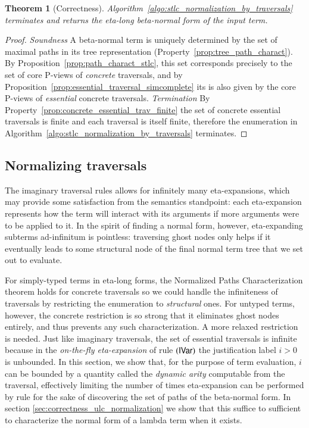 \documentclass{elsarticle}
\theoremstyle{plain}
\newtheorem{theorem}{Theorem}[section]
\theoremstyle{definition}
\theoremstyle{remark}
\begin{document}
\begin{theorem}[Correctness]
Algorithm~\ref{algo:stlc_normalization_by_traversals} terminates and returns the eta-long beta-normal form of the input term.
\end{theorem}
\begin{proof}
\emph{Soundness} A beta-normal term is uniquely determined by the set of maximal paths in its tree representation (Property~\ref{prop:tree_path_charact}). By Proposition~\ref{prop:path_charact_stlc}, this set corresponds precisely to the set of core P-views of \emph{concrete} traversals,
and by Proposition~\ref{prop:essential_traversal_simcomplete} its is also given by the core P-views of \emph{essential} concrete traversals.
\emph{Termination} By Property~\ref{prop:concrete_essential_trav_finite} the set of concrete essential traversals is finite and each traversal is itself finite, therefore the enumeration in Algorithm~\ref{algo:stlc_normalization_by_traversals} terminates.
\end{proof}

\subsection{Normalizing traversals}

The imaginary traversal rules allows for infinitely many eta-expansions, which may provide some satisfaction from the semantics standpoint: each eta-expansion represents how the term will interact with its arguments if more arguments were to be applied to it. In the spirit of finding a normal form, however, eta-expanding subterms ad-infinitum is pointless: traversing ghost nodes only helps if it eventually leads to some structural node of the final normal term tree that we set out to evaluate.

For simply-typed terms in eta-long forms, the
Normalized Paths Characterization theorem holds for concrete traversals so we could  handle the infiniteness of traversals by restricting the enumeration to \emph{structural} ones. For untyped terms, however, the concrete restriction
is so strong that it eliminates ghost nodes entirely, and thus prevents any such characterization. A more relaxed restriction is needed.
Just like imaginary traversals, the set of essential traversals is infinite because in the \emph{on-the-fly eta-expansion} of rule $\mathbf{({\sf IVar})}$ the justification label $i>0$ is unbounded. In this section, we show that,
for the purpose of term evaluation, $i$ can be bounded by a quantity called the \emph{dynamic arity} computable from the traversal,
effectively limiting the number of times eta-expansion can be performed by rule  for the sake of discovering the set of paths of the beta-normal form. In section \ref{sec:correctness_ulc_normalization} we show that this suffice to  sufficient to characterize the normal form of a lambda term when it exists.
\end{document}
